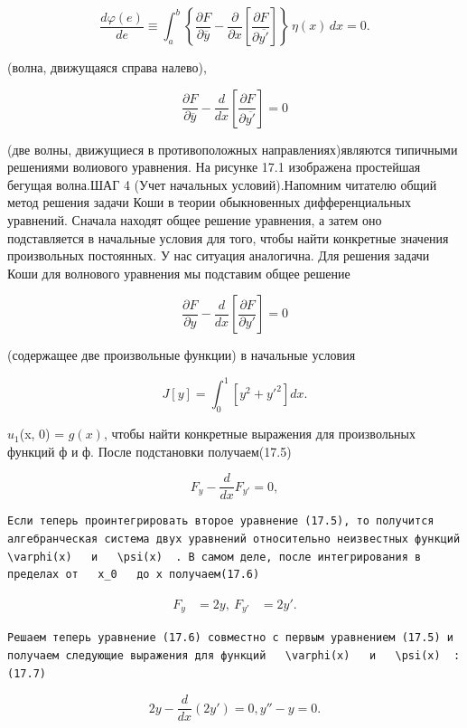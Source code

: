 \documentclass[
  ukrainian,
]{article}
\begin{document}
\[
\frac{d\varphi(e)}{de} \equiv \int_{a}^{b} \left\{ \frac{\partial F}{\partial \overline{y}} - \frac{\partial}{\partial x} \left[ \frac{\partial F}{\partial \overline{y'}} \right] \right\} \, \eta(x) \, dx = 0.
\]

(волна, движущаяся справа налево),

\[
\frac{\partial F}{\partial \overline{y}} - \frac{d}{dx} \left[ \frac{\partial F}{\partial \overline{y'}} \right] = 0
\]

(две волны, движущиеся в противоположных направлениях)являются типичными
решениями волиового уравнения. На рисунке 17.1 изображена простейшая
бегущая волна.ШАГ 4 (Учет начальных условий).Напомним читателю общий
метод решения задачи Коши в теории обыкновенных дифференциальных
уравнений. Сначала находят общее решение уравнения, а затем оно
подставляется в начальные условия для того, чтобы найти конкретные
значения произвольных постоянных. У нас ситуация аналогична. Для решения
задачи Коши для волнового уравнения мы подставим общее решение

\[
\frac{\partial F}{\partial y} - \frac{d}{dx} \left[ \frac{\partial F}{\partial y'} \right] = 0
\]

(содержащее две произвольные функции) в начальные условия

\[
J[y] = \int_{0}^{1} [y^{2} + y'^{2}] dx.
\]

\(u_1\)(x, 0) = \(g(x)\), чтобы найти конкретные выражения для
произвольных функций ф и ф. После подстановки получаем(17.5)

\[
F_y - \frac{d}{dx} F_{y'} = 0,
\]

\begin{verbatim}
Если теперь проинтегрировать второе уравнение (17.5), то получится алгебранческая система двух уравнений относительно неизвестных функций   \varphi(x)   и   \psi(x)  . В самом деле, после интегрирования в пределах от   x_0   до x получаем(17.6)
\end{verbatim}

\[
\begin{aligned} F_y &= 2y, \ F_{y'} &= 2y'. \end{aligned}
\]

\begin{verbatim}
Решаем теперь уравнение (17.6) совместно с первым уравнением (17.5) и получаем следующие выражения для функций   \varphi(x)   и   \psi(x)  :(17.7)
\end{verbatim}

\[
2y - \frac{d}{dx}(2y') = 0,
y'' - y = 0.
\]
\end{document}
